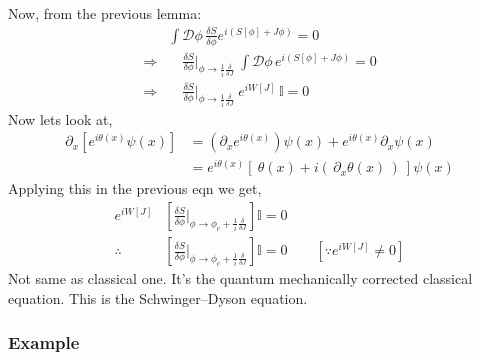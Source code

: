 \documentclass[14pt]{article} %
\begin{document}
{Now, from the previous lemma:
\begin{align*}
&\int \mathcal{D}\phi \, \frac{\delta S}{\delta \phi} e^{i(S[\phi] + J\phi)} = 0 \\
\Rightarrow & \quad \frac{\delta S}{\delta \phi} \bigg|_{\phi \rightarrow\frac{1}{i}\frac{\delta}{\delta J} } ~ \int \mathcal{D}\phi\, e^{i(S[\phi] + J\phi)} = 0 \\
\Rightarrow & \quad \frac{\delta S}{\delta \phi} \bigg|_{\phi \rightarrow\frac{1}{i}\frac{\delta}{\delta J} } ~ e^{iW[J]} \, \mathbb{I} = 0
\end{align*}
Now lets look at,
\begin{align*}
\partial_x \left[ e^{i\theta(x)} \psi(x) \right] &= (\partial_x e^{i\theta(x)}) \psi(x) + e^{i\theta(x)} \partial_x \psi(x) \\
&= e^{i\theta(x)} \left[ ~\theta(x) + i (\,\partial_x \theta(x)\,)~ \right] \psi(x)
\end{align*}
Applying this in the previous eqn we get,
\begin{align*}
e^{iW[J]} &\left[ \frac{\delta S}{\delta \phi}\bigg|_{\phi \rightarrow \phi_c + \frac{1}{i}\frac{\delta}{\delta J} }  \right] \mathbb{I} = 0 \\
\therefore &\left[ \frac{\delta S}{\delta \phi}\bigg|_{\phi \rightarrow \phi_c + \frac{1}{i}\frac{\delta}{\delta J} }  \right] \mathbb{I} = 0 \qquad [\because e^{iW[J]} \neq 0]
\end{align*}
Not same as classical one. It’s the quantum mechanically corrected classical equation. This is the Schwinger–Dyson equation.

\subsubsection*{Example}
}
\end{document}
